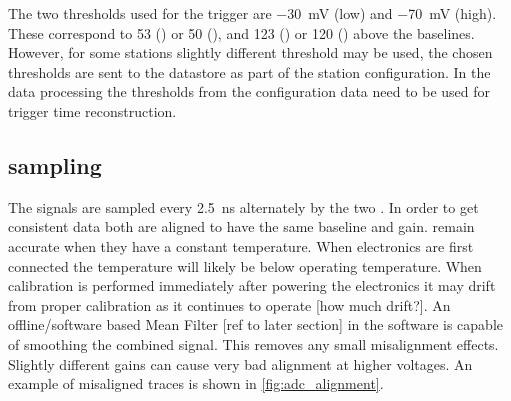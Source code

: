 The two thresholds used for the trigger are \SI{-30}{\milli\volt} (low) and  \SI{-70}{\milli\volt} (high). These correspond to \SI{53}{\adc} (\hisparcii) or \SI{50}{\adc} (\hisparciii), and \SI{123}{\adc} (\hisparcii) or \SI{120}{\adc} (\hisparciii) above the baselines. However, for some stations slightly different threshold may be used, the chosen thresholds are sent to the datastore as part of the station configuration. In the data processing the thresholds from the configuration data need to be used for trigger time reconstruction.


\subsection{\adc sampling}

The \pmt signals are sampled every \SI{2.5}{\ns} alternately by the two \adcs.
In order to get consistent data both \adcs are aligned to have the same baseline and gain. \adcs remain accurate when they have a constant temperature. When \hisparc electronics are first connected the temperature will likely be below operating temperature. When calibration is performed immediately after powering the electronics it may drift from proper calibration as it continues to operate [how much drift?]. An offline/software based Mean Filter [ref to later section] in the software is capable of smoothing the combined signal. This removes any small misalignment effects. Slightly different gains can cause very bad alignment at higher voltages. An example of misaligned traces is shown in \cref{fig:adc_alignment}.

